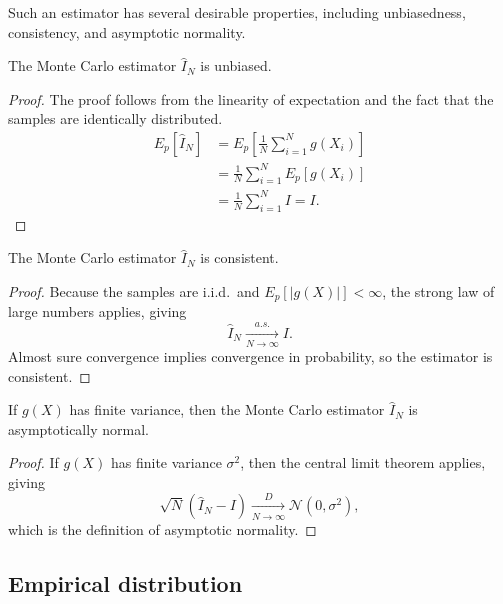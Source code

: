 Such an estimator has several desirable properties, including unbiasedness, consistency, and asymptotic normality.

\begin{proposition}
    The Monte Carlo estimator $\hat{I}_N$ is unbiased.
\end{proposition}
\begin{proof}
    The proof follows from the linearity of expectation and the fact that the samples are identically distributed.
    \begin{align}
        E_p[\hat{I}_N] &= E_p\left[\frac{1}{N}\sum_{i=1}^{N} g(X_i)\right] \\
        &= \frac{1}{N}\sum_{i=1}^N E_p[g(X_i)] \\
        &= \frac{1}{N}\sum_{i=1}^N I = I.
    \end{align}
\end{proof}

\begin{proposition}
    The Monte Carlo estimator $\hat{I}_N$ is consistent.
\end{proposition}
\begin{proof}
    Because the samples are i.i.d.\ and $E_p[|g(X)|] < \infty$, the strong law of large numbers applies, giving
    \begin{equation}
        \hat{I}_N \xrightarrow[N\to\infty]{a.s.} I.
    \end{equation}
    Almost sure convergence implies convergence in probability, so the estimator is consistent.
\end{proof}

\begin{proposition}
    If $g(X)$ has finite variance, then the Monte Carlo estimator $\hat{I}_N$ is asymptotically normal.
\end{proposition}
\begin{proof}
    If $g(X)$ has finite variance $\sigma^2$, then the central limit theorem applies, giving
    \begin{equation}
        \sqrt{N}\left(\hat{I}_N-I\right)
        \xrightarrow[N\to\infty]{D}
        \mathcal{N}(0,\sigma^2),
    \end{equation}
    which is the definition of asymptotic normality.
\end{proof}

\subsection{Empirical distribution}
\label{sec:empirical_distribution}

